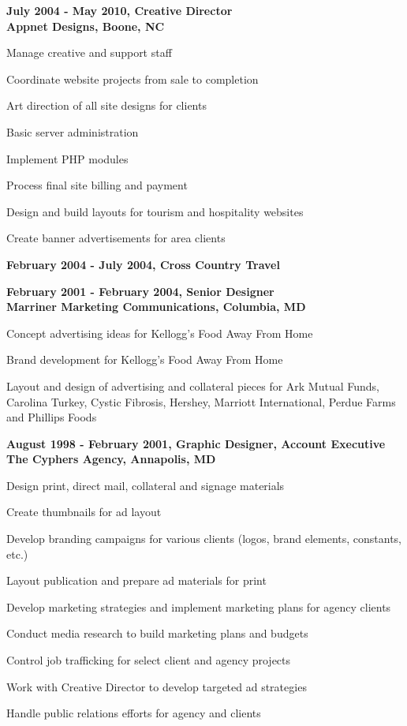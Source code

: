 \documentclass[letterpaper,10pt,final]{memoir}
\newcommand{\Sep}{\vspace{1.5em}}
\newcommand{\CVItem}[1]
	{\textbf{\color{BrickRed} #1}}
\begin{document}
\CVItem{July 2004 - May 2010, Creative Director\\
Appnet Designs, Boone, NC}
\begin{compactitem}[\color{BrickRed}$\circ$]
	\item Manage creative and support staff
	\item Coordinate website projects from sale to completion
	\item Art direction of all site designs for clients
	\item Basic server administration
	\item Implement PHP modules
	\item Process final site billing and payment
	\item Design and build layouts for tourism and hospitality websites
	\item Create banner advertisements for area clients
\end{compactitem}
\Sep

\CVItem{February 2004 - July 2004, Cross Country Travel}
\Sep

\CVItem{February 2001 - February 2004, Senior Designer\\
Marriner Marketing Communications, Columbia, MD}
\begin{compactitem}[\color{BrickRed}$\circ$]
	\item Concept advertising ideas for Kellogg's Food Away From Home
	\item Brand development for Kellogg's Food Away From Home
	\item Layout and design of advertising and collateral pieces for Ark Mutual Funds, Carolina Turkey, Cystic Fibrosis, Hershey, Marriott International, Perdue Farms and Phillips Foods
\end{compactitem}
\Sep

\CVItem{August 1998 - February 2001, Graphic Designer, Account Executive\\
The Cyphers Agency, Annapolis, MD}
\begin{compactitem}[\color{BrickRed}$\circ$]
	\item Design print, direct mail, collateral and signage materials
	\item Create thumbnails for ad layout
	\item Develop branding campaigns for various clients (logos, brand elements, constants, etc.)
	\item Layout publication and prepare ad materials for print
	\item Develop marketing strategies and implement marketing plans for agency clients
	\item Conduct media research to build marketing plans and budgets
	\item Control job trafficking for select client and agency projects
	\item Work with Creative Director to develop targeted ad strategies
	\item Handle public relations efforts for agency and clients
\end{compactitem}
\Sep
\end{document}
